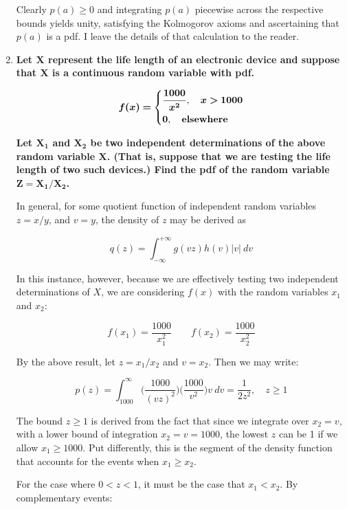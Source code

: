 \documentclass[10pt, oneside]{article}   	%
\theoremstyle{definition}
\begin{document}
\begin{enumerate}[label=6.\arabic*]
Clearly $p(a) \geq 0$ and integrating $p(a)$ piecewise across the respective bounds yields unity, satisfying the Kolmogorov axioms and ascertaining that $p(a)$ is a pdf. I leave the details of that calculation to the reader.

\item  \begin{tcolorbox}[
  colback=Cerulean!5!white,
  colframe=Cerulean!75!black]
\textbf{Let $\bm{X}$ represent the life length of an electronic device and suppose that $\bm{X}$ is a continuous random variable with pdf.}

\[
\bm{f(x) =} \begin{dcases}
\bm{\frac{1000}{x^2}}, \quad \bm{x > 1000} \\
\bm{0}, \quad \textbf{elsewhere}
\end{dcases}
\]

\textbf{Let $\bm{X_1}$ and $\bm{X_2}$ be two independent determinations of the above random variable $\bm{X}$. (That is, suppose that we are testing the life length of two such devices.) Find the pdf of the random variable $\bm{Z = X_1 / X_2}$.}
\end{tcolorbox}

In general, for some quotient function of independent random variables $z = x/y$, and $v = y$, the density of $z$ may be derived as

\[ q(z) = \int^{+\infty}_{-\infty} g(vz) h(v) |v| \ dv \]

In this instance, however, because we are effectively testing two independent determinations of $X$, we are considering $f(x)$ with the random variables $x_1$ and $x_2$:

\[ f(x_1) = \frac{1000}{x_1^2} \qquad f(x_2) = \frac{1000}{x_2^2} \]

By the above result, let $z = x_1 / x_2$ and $v = x_2$. Then we may write:

\[ p(z) = \int^\infty_{1000} \Big( \frac{1000}{(vz)^2} \Big) \Big( \frac{1000}{v^2} \Big) v \ dv = \boxed{\frac{1}{2z^2}, \quad z \geq 1} \]

The bound $z \geq 1$ is derived from the fact that since we integrate over $x_2 = v$, with a lower bound of integration $x_2 = v = 1000$, the lowest $z$ can be 1 if we allow $x_1 \geq 1000$. Put differently, this is the segment of the density function that accounts for the events when $x_1 \geq x_2$.

For the case where $0 < z < 1$, it must be the case that $x_1 < x_2$. By complementary events:


\end{enumerate}
\end{document}

